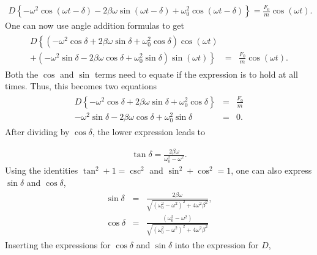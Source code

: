 \documentclass[letterpaper,10pt,english]{sphinxmanual}
\begin{document}
\begin{equation*}
\begin{split}
\begin{equation}
D\left\{-\omega^2\cos(\omega t-\delta)-2\beta\omega\sin(\omega t-\delta)+\omega_0^2\cos(\omega t-\delta)\right\}=\frac{F_0}{m}\cos(\omega t).
\label{_auto9} \tag{14}
\end{equation}
\end{split}
\end{equation*}
One can now use angle addition formulas to get
\begin{equation*}
\begin{split}
\begin{eqnarray}
D\left\{(-\omega^2\cos\delta+2\beta\omega\sin\delta+\omega_0^2\cos\delta)\cos(\omega t)\right.&&\\
\nonumber
\left.+(-\omega^2\sin\delta-2\beta\omega\cos\delta+\omega_0^2\sin\delta)\sin(\omega t)\right\}
&=&\frac{F_0}{m}\cos(\omega t).
\end{eqnarray}
\end{split}
\end{equation*}
Both the \(\cos\) and \(\sin\) terms need to equate if the expression is to hold at all times. Thus, this becomes two equations
\begin{equation*}
\begin{split}
\begin{eqnarray}
D\left\{-\omega^2\cos\delta+2\beta\omega\sin\delta+\omega_0^2\cos\delta\right\}&=&\frac{F_0}{m}\\
\nonumber
-\omega^2\sin\delta-2\beta\omega\cos\delta+\omega_0^2\sin\delta&=&0.
\end{eqnarray}
\end{split}
\end{equation*}
After dividing by \(\cos\delta\), the lower expression leads to




\begin{equation*}
\begin{split}
\begin{equation}
\tan\delta=\frac{2\beta\omega}{\omega_0^2-\omega^2}.
\label{_auto10} \tag{15}
\end{equation}
\end{split}
\end{equation*}
Using the identities \(\tan^2+1=\csc^2\) and \(\sin^2+\cos^2=1\), one can also express \(\sin\delta\) and \(\cos\delta\),
\begin{equation*}
\begin{split}
\begin{eqnarray}
\sin\delta&=&\frac{2\beta\omega}{\sqrt{(\omega_0^2-\omega^2)^2+4\omega^2\beta^2}},\\
\nonumber
\cos\delta&=&\frac{(\omega_0^2-\omega^2)}{\sqrt{(\omega_0^2-\omega^2)^2+4\omega^2\beta^2}}
\end{eqnarray}
\end{split}
\end{equation*}
Inserting the expressions for \(\cos\delta\) and \(\sin\delta\) into the expression for \(D\),
\end{document}
